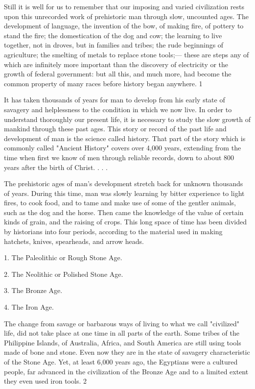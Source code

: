 Still it is well for us to remember that our imposing and varied civilization rests upon this
unrecorded work of prehistoric man through slow, uncounted ages. The development of
language, the invention of the bow, of making fire, of pottery to stand the fire; the
domestication of the dog and cow; the learning to live together, not in droves, but in families
and tribes; the rude beginnings of agriculture; the smelting of metals to replace stone tools;—
these are steps any of which are infinitely more important than the discovery of electricity or
the growth of federal government: but all this, and much more, had become the common
property of many races before history began anywhere. 1

It has taken thousands of years for man to develop from his early state of savagery and
helplessness to the condition in which we now live. In order to understand thoroughly our
present life, it is necessary to study the slow growth of mankind through these past ages. This
story or record of the past life and development of man is the science called history. That part
of the story which is commonly called "Ancient History" covers over 4,000 years, extending
from the time when first we know of men through reliable records, down to about 800 years
after the birth of Christ. . . .

The prehistoric ages of man's development stretch back for unknown thousands of years.
During this time, man was slowly learning by bitter experience to light fires, to cook food,
and to tame and make use of some of the gentler animals, such as the dog and the horse.
Then came the knowledge of the value of certain kinds of grain, and the raising of crops.
This long space of time has been divided by historians into four periods, according to the
material used in making hatchets, knives, spearheads, and arrow heads.

1. The Paleolithic or Rough Stone Age.

2. The Neolithic or Polished Stone Age.

3. The Bronze Age.

4. The Iron Age.

The change from savage or barbarous ways of living to what we call "civilized" life, did not
take place at one time in all parts of the earth. Some tribes of the Philippine Islands, of
Australia, Africa, and South America are still using tools made of bone and stone. Even now
they are in the state of savagery characteristic of the Stone Age. Yet, at least 6,000 years ago,
the Egyptians were a cultured people, far advanced in the civilization of the Bronze Age and
to a limited extent they even used iron tools. 2

